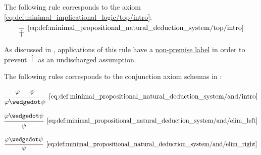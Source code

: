 \begin{definition}
\begin{thmenum}
     The following rule corresponds to the axiom \eqref{eq:def:minimal_implicational_logic/top/intro}:
    \begin{equation*}\taglabel[\( \top^+ \)]{eq:def:minimal_propositional_natural_deduction_system/top/intro}
      \begin{prooftree}
        \infer0[\ref{eq:def:minimal_propositional_natural_deduction_system/top/intro}]{ \syntop }
      \end{prooftree}
    \end{equation*}

    As discussed in , applications of this rule have a \hyperref[def:natural_deduction_proof_tree/premises]{non-premise label} in order to prevent \( \dot\top \) as an undischarged assumption.

     The following rules corresponds to the conjunction axiom schemas in :

    \begin{minipage}{0.3\textwidth}
      \begin{equation*}\taglabel[\( \wedge^+ \)]{eq:def:minimal_propositional_natural_deduction_system/and/intro}
        \begin{prooftree}
          \hypo{ \varphi }
          \hypo{ \psi }
          \infer2[\ref{eq:def:minimal_propositional_natural_deduction_system/and/intro}]{ \varphi \synwedge \psi }
        \end{prooftree}
      \end{equation*}
    \end{minipage}
    \hfill
    \begin{minipage}{0.3\textwidth}
      \begin{equation*}\taglabel[\( \wedge^{-_L} \)]{eq:def:minimal_propositional_natural_deduction_system/and/elim_left}
        \begin{prooftree}
          \hypo{ \varphi \synwedge \psi }
          \infer1[\ref{eq:def:minimal_propositional_natural_deduction_system/and/elim_left}]{ \psi }
        \end{prooftree}
      \end{equation*}
    \end{minipage}
    \hfill
    \begin{minipage}{0.3\textwidth}
      \begin{equation*}\taglabel[\( \wedge^{-_R} \)]{eq:def:minimal_propositional_natural_deduction_system/and/elim_right}
        \begin{prooftree}
          \hypo{ \varphi \synwedge \psi }
          \infer1[\ref{eq:def:minimal_propositional_natural_deduction_system/and/elim_right}]{ \varphi }
        \end{prooftree}
      \end{equation*}
    \end{minipage}


\end{thmenum}
\end{definition}
